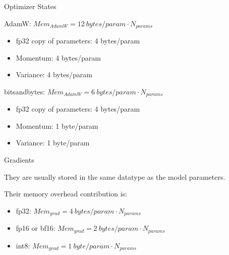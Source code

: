 \begin{vbframe}{Optimizer States}

\vfill

AdamW: $Mem_{AdamW} = 12 ~bytes/param \cdot N_{params}$
\begin{itemize}
 	\item fp32 copy of parameters: 4 bytes/param
 	\item Momentum: 4 bytes/param
	\item Variance: 4 bytes/param
\end{itemize}

\vskip3mm

bitsandbytes: $Mem_{AdamW} = 6 ~bytes/param \cdot N_{params}$
\begin{itemize}
 	\item fp32 copy of parameters: 4 bytes/param
 	\item Momentum: 1 byte/param
	\item Variance: 1 byte/param
\end{itemize}

%

\vfill

\end{vbframe}


\begin{vbframe}{Gradients}

\vfill

They are usually stored in the same datatype as the model parameters. \newline

Their memory overhead contribution is: \newline


\begin{itemize}
 	\item fp32: $Mem_{grad} = 4 ~bytes/param \cdot N_{params}$
 	\item fp16 or bf16: $Mem_{grad} = 2 ~bytes/param \cdot N_{params}$
	\item int8: $Mem_{grad} = 1 ~byte/param \cdot N_{params}$
\end{itemize}

\vfill

\end{vbframe}

